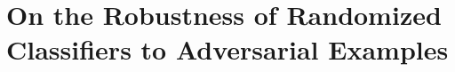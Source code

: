 













\newcommand{\perturb}{{\tau}}
\newcommand{\integer}{\mathbb{N}}
\newcommand{\inputdim}{d}
\newcommand{\numclasses}{K}
\newcommand{\hypothesis}{{h}}
\newcommand{\fullSample}{\mathcal{S}}
\newcommand{\equationspace}{\thinspace}
\newcommand{\CandidateClass}{\Bar{\mathcal{H}}}
\newcommand{\Qone}{\textbf{Q1}}
\newcommand{\Qtwo}{\textbf{Q2}}
\newcommand{\zerooneloss}{\loss_{0/1}}
\newcommand{\zo}{0/1}
\newcommand\numberthis{\addtocounter{equation}{1}\tag{\theequation}}
\newcommand{\hypothesisbinary}{h}
\newcommand{\comp}{~\mathsf{c}}
\renewcommand{\th}{\textsuperscript{\textup{th}}\xspace}





\newcommand{\etal}{\emph{et al.}}
\newcommand{\iid}{\emph{i.i.d.}}
\newcommand{\ltwo}{\ell_2}
\newcommand{\linf}{\ell_\infty}


\newcommand\yann[1]{{\color{red} #1}}
\chapter{On the Robustness of Randomized Classifiers to Adversarial Examples}


